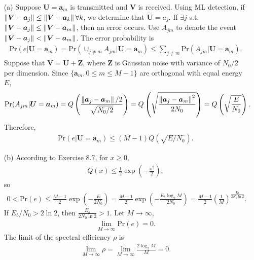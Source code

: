 \documentclass{assignment}
\begin{document}
\begin{sol}
    \begin{itemize}
        \item[(a)] Suppose $\bm{U}=\bm{a}_m$ is transmitted and $\bm{V}$ is received. Using ML detection, if $\left\lVert\bm{V}-\bm{a}_j\right\rVert\leq\left\lVert\bm{V}-\bm{a}_k\right\rVert\forall k$, we determine that $\tilde{\bm{U}}=a_j$. If $\exists j$ s.t. $\left\lVert\bm{V}-\bm{a}_j\right\rVert\leq\left\lVert\bm{V}-\bm{a}_m\right\rVert$, then an error occurs. Use $A_{jm}$ to denote the event $\left\lVert\bm{V}-\bm{a}_j\right\rVert<\left\lVert\bm{V}-\bm{a}_m\right\rVert$. The error probability is
        \begin{align}
            \mathrm{Pr}(e\vert\bm{U}=\bm{a}_m)=\mathrm{Pr}(\cup_{j\neq m}A_{jm}\vert\bm{U}=\bm{a}_m)\leq\sum_{j\neq m}\mathrm{Pr}(A_{jm}\vert\bm{U}=\bm{a}_m).
        \end{align}
        Suppose that $\bm{V}=\bm{U}+\bm{Z}$, where $\bm{Z}$ is Gaussian noise with variance of $N_0/2$ per dimension. Since $\{\bm{a}_m,0\leq m\leq M-1\}$ are orthogonal with equal energy $E$,
        \begin{align}
            \mathrm{Pr}(A_{jm}\vert\bm{U}=\bm{a}_m)=Q\left(\frac{\left\lVert\bm{a}_j-\bm{a}_m\right\rVert/2}{\sqrt{N_0/2}}\right)=Q\left(\sqrt{\frac{\left\lVert\bm{a}_j-\bm{a}_m\right\rVert^2}{2N_0}}\right)=Q\left(\sqrt{\frac{E}{N_0}}\right).
        \end{align}
        Therefore,
        \begin{align}
            \mathrm{Pr}(e\vert\bm{U}=\bm{a}_m)\leq(M-1)Q(\sqrt{E/N_0}).
        \end{align}
        \item[(b)] According to Exercise 8.7, for $x\geq 0$,
        \begin{align}
            Q(x)\leq\frac{1}{2}\exp\left(-\frac{x^2}{2}\right),
        \end{align}
        so
        \begin{align}
            0<\mathrm{Pr}(e)\leq\frac{M-1}{2}\exp\left(-\frac{E}{2N_0}\right)=\frac{M-1}{2}\exp\left(-\frac{E_b\log_2M}{2N_0}\right)=\frac{M-1}{2}\left(\frac{1}{M}\right)^{\frac{E_b}{2N_0\ln 2}}.
        \end{align}
        If $E_b/N_0>2\ln 2$, then $\frac{E_b}{2N_0\ln 2}>1$. Let $M\rightarrow\infty$,
        \begin{align}
            \lim_{M\rightarrow\infty}\mathrm{Pr}(e)=0.
        \end{align}
        The limit of the spectral efficiency $\rho$ is
        \begin{align}
            \lim_{M\rightarrow\infty}\rho=\lim_{M\rightarrow\infty}\frac{2\log_2M}{M}=0.
        \end{align}
    \end{itemize}
\end{sol}
\end{document}
